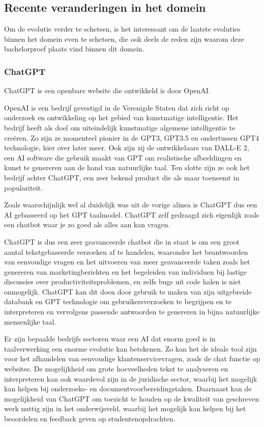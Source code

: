 \subsection{Recente veranderingen in het domein}

Om de evolutie verder te schetsen, is het interessant om de laatste evoluties binnen het domein even te schetsen, die ook deels de reden zijn waarom deze bachelorproef plaats vind binnen dit domein. 

\subsubsection{ChatGPT}
ChatGPT is een openbare website die ontwikkeld is door OpenAI.

OpenAI is een bedrijf gevestigd in de Verenigde Staten dat zich richt op onderzoek en ontwikkeling op het gebied van kunstmatige intelligentie. Het bedrijf heeft als doel om uiteindelijk kunstmatige algemene intelligentie te creëren. Zo zijn ze momenteel pionier in de GPT3, GPT3.5 en ondertussen GPT4 technologie, hier over later meer. Ook zijn zij de ontwikkelaars van DALL-E 2, een AI software die gebruik maakt van GPT om realistische afbeeldingen en kunst te genereren aan de hand van natuurlijke taal. Ten slotte zijn ze ook het bedrijf achter ChatGPT, een zeer bekend product die als maar toeneemt in populariteit.

Zoals waarschijnlijk wel al duidelijk was uit de vorige alinea is ChatGPT dus een AI gebasseerd op het GPT taalmodel. ChatGPT zelf gedraagd zich eigenlijk zoals een chatbot waar je zo goed als alles aan kan vragen.

ChatGPT is dus een zeer geavanceerde chatbot die in staat is om een groot aantal tekstgebaseerde verzoeken af te handelen, waaronder het beantwoorden van eenvoudige vragen en het uitvoeren van meer geavanceerde taken zoals het genereren van marketingberichten en het begeleiden van individuen bij lastige discussies over productiviteitsproblemen, en zelfs bugs uit code halen is niet onmogelijk. ChatGPT kan dit doen door gebruik te maken van zijn uitgebreide databank en GPT technologie om gebruikersverzoeken te begrijpen en te interpreteren en vervolgens passende antwoorden te genereren in bijna natuurlijke mensenlijke taal. 

Er zijn bepaalde bedrijfs sectoren waar een AI dat enorm goed is in taalverwerking een enorme evolutie kan betekenen. Zo kan het de ideale tool zijn voor het afhandelen van eenvoudige klantenservicevragen, zoals de chat functie op websites. De mogelijkheid om grote hoeveelheden tekst te analyseren en interpreteren kan ook waardevol zijn in de juridische sector, waarbij het mogelijk kan helpen bij onderzoeks- en documentvoorbereidingstaken. Daarnaast kan de mogelijkheid van ChatGPT om toezicht te houden op de kwaliteit van geschreven werk nuttig zijn in het onderwijsveld, waarbij het mogelijk kan helpen bij het beoordelen en feedback geven op studentenopdrachten.

